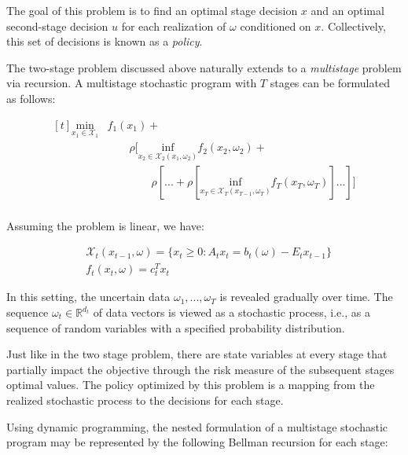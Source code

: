 \documentclass{juliacon}
\begin{document}
The goal of this problem is to find an optimal stage decision $x$ and an optimal second-stage decision $u$ for each realization of $\omega$ conditioned on $x$. Collectively, this set of decisions is known as a \textit{policy}.

The two-stage problem discussed above naturally extends to a \textit{multistage} problem via recursion. A multistage stochastic program with $T$ stages can be formulated as follows:

 \begin{equation*}
    \begin{aligned}[t]
        \underset{x_1 \in \mathcal{X}_1}{\text{min}}
        & f_1(x_1) + \\ 
        & \qquad \rho[ \underset{x_2 \in \mathcal{X}_2(x_1,\omega_{2})}{\text{inf}} f_2(x_2,\omega_{2}) + \\ 
        & \qquad \qquad \rho[... + \rho[\underset{x_T \in \mathcal{X}_T(x_{T-1},\omega_{T})}{\text{inf}} f_T(x_T,\omega_{T})]...]] \\
    \end{aligned}
\end{equation*}

Assuming the problem is linear, we have:

 \begin{equation*}
    \begin{aligned}
        & \mathcal{X}_{t}(x_{t-1},\omega) = \big\{ x_t \geq 0 : A_t x_t = b_t(\omega)- E_t x_{t-1} \big\} \\
        & f_t(x_t,\omega) = c_t^T x_t
    \end{aligned}
\end{equation*}

In this setting, the uncertain data $\omega_1 , ..., \omega_T$ is revealed gradually over time. The sequence $\omega_t \in \mathbb{R}^{d_t}$ of data vectors is viewed as a stochastic process, i.e., as a sequence of random variables with a specified probability distribution.

Just like in the two stage problem, there are state variables at every stage that partially impact the objective through the risk measure of the subsequent stages optimal values. The policy optimized by this problem is a mapping from the realized stochastic process to the decisions for each stage. 

Using dynamic programming, the nested formulation of a multistage stochastic program may be represented by the following Bellman recursion for each stage:
\end{document}
